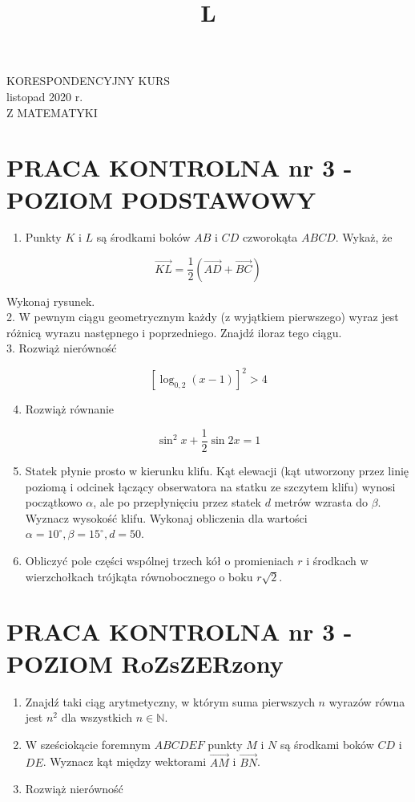 \documentclass[10pt]{article}
\title{L }
\author{}
\date{}
\begin{document}
\maketitle
KORESPONDENCYJNY KURS\\
listopad 2020 r.\\
Z MATEMATYKI

\section*{PRACA KONTROLNA nr 3 - POZIOM PODSTAWOWY}
\begin{enumerate}
  \item Punkty $K$ i $L$ są środkami boków $A B$ i $C D$ czworokąta $A B C D$. Wykaż, że
\end{enumerate}

$$
\overrightarrow{K L}=\frac{1}{2}(\overrightarrow{A D}+\overrightarrow{B C})
$$

Wykonaj rysunek.\\
2. W pewnym ciągu geometrycznym każdy (z wyjątkiem pierwszego) wyraz jest różnicą wyrazu następnego i poprzedniego. Znajdź iloraz tego ciągu.\\
3. Rozwiąż nierówność

$$
\left[\log _{0,2}(x-1)\right]^{2}>4
$$

\begin{enumerate}
  \setcounter{enumi}{3}
  \item Rozwiąż równanie
\end{enumerate}

$$
\sin ^{2} x+\frac{1}{2} \sin 2 x=1
$$

\begin{enumerate}
  \setcounter{enumi}{4}
  \item Statek płynie prosto w kierunku klifu. Kąt elewacji (kąt utworzony przez linię poziomą i odcinek łączący obserwatora na statku ze szczytem klifu) wynosi początkowo $\alpha$, ale po przepłynięciu przez statek $d$ metrów wzrasta do $\beta$. Wyznacz wysokość klifu. Wykonaj obliczenia dla wartości $\alpha=10^{\circ}, \beta=15^{\circ}, d=50$.
  \item Obliczyć pole części wspólnej trzech kół o promieniach $r$ i środkach w wierzchołkach trójkąta równobocznego o boku $r \sqrt{2}$.
\end{enumerate}

\section*{PRACA KONTROLNA nr 3 - POZIOM RoZsZERzony}
\begin{enumerate}
  \item Znajdź taki ciąg arytmetyczny, w którym suma pierwszych $n$ wyrazów równa jest $n^{2}$ dla wszystkich $n \in \mathbb{N}$.
  \item W sześciokącie foremnym $A B C D E F$ punkty $M$ i $N$ są środkami boków $C D$ i $D E$. Wyznacz kąt między wektorami $\overrightarrow{A M}$ i $\overrightarrow{B N}$.
  \item Rozwiąż nierówność
\end{enumerate}
\end{document}
